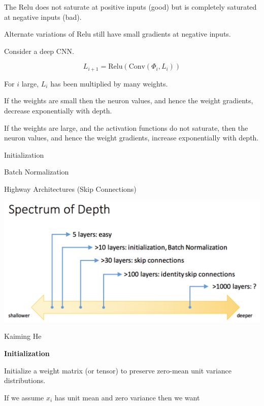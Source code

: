 {\vfill
The Relu does not saturate at positive inputs (good) but is completely saturated at negative inputs (bad).

\vfill
Alternate variations of Relu still have small gradients at negative inputs.


Consider a deep CNN.

$$L_{i+1} = \mathrm{Relu}(\mathrm{Conv}(\Phi_i,L_i))$$

\vfill
For $i$ large, $L_i$ has been multiplied by many weights.

\vfill
If the weights are small then the neuron values, and hence the weight gradients, decrease exponentially with depth.

\vfill
If the weights are large, and the activation functions do not saturate, then the neuron values, and hence the weight gradients,
increase exponentially with depth.


\centerline{Initialization}

\vfill
\centerline{Batch Normalization}

\vfill
\centerline{Highway Architectures (Skip Connections)}


\centerline{\includegraphics[width = 9in]{../images/DepthSpectrum}}

\centerline{\large Kaiming He}

\slide{}
\centerline{\bf Initialization}
\vfill


Initialize a weight matrix (or tensor) to preserve zero-mean unit variance distributions.

\vfill
If we assume $x_i$ has unit mean and zero variance then we want

}
